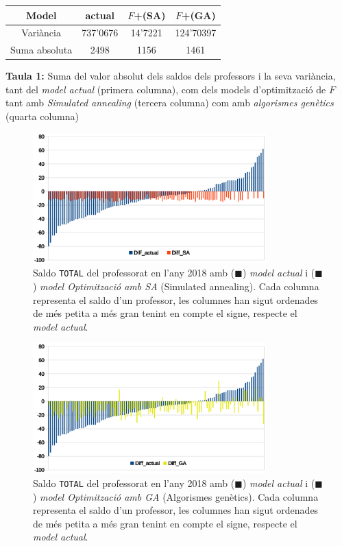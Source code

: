 \documentclass[10pt,twocolumn]{article}
\begin{document}
\begin{tcolorbox}[colback=white,coltitle=black,colframe=white, colback=white]
{\centering
	\small
	\begin{tabular}{|c|c|c|c|}
	\hline
     \textbf{Model}&\textbf{actual}&\textbf{$F$+(SA)}&\textbf{$F$+(GA)}\\
     \hline
     Variància&737'0676&14'7221&124'70397\\
     \hline
     Suma absoluta&2498&1156&1461\\
     \hline
	\end{tabular}
}
\end{tcolorbox}
\noindent \textbf{Taula 1:} \small{Suma del valor absolut dels saldos dels professors  i la seva variància, tant del \textit{model actual} (primera columna), com dels models d'optimització de $F$ tant amb \textit{Simulated annealing} (tercera columna) com amb \textit{algorismes genètics} (quarta columna)}
	\begin{figure}[ht]
		\centering
		\includegraphics[width=9cm]{sorted_mo}
		\caption{ \small Saldo \texttt{TOTAL}  del professorat en l'any 2018 amb ({\color{blue!70}$\blacksquare$}) \textit{model actual}  i ({\color{orange!70!red!90}$\blacksquare$}) \textit{model Optimització amb SA} (Simulated annealing). Cada columna representa el saldo d'un professor, les columnes han sigut ordenades de més petita a més gran tenint en compte el signe, respecte el \textit{model actual}. }
		\label{fig:6}
	\end{figure}
	\begin{figure}[ht]
		\centering
		\includegraphics[width=9cm]{sorted2_mo}
		\caption{ \small Saldo \texttt{TOTAL}  del professorat en l'any 2018 amb ({\color{blue!70}$\blacksquare$}) \textit{model actual}  i ({\color{yellow!70!gray!90}$\blacksquare$}) \textit{model Optimització amb GA} (Algorismes genètics). Cada columna representa el saldo d'un professor, les columnes han sigut ordenades de més petita a més gran tenint en compte el signe, respecte el \textit{model actual}. }
		\label{fig:64}
	\end{figure}
\end{document}
